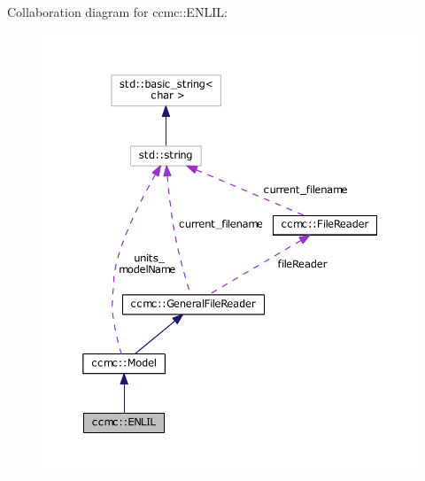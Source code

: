 Collaboration diagram for ccmc\-:\-:E\-N\-L\-I\-L\-:
\nopagebreak
\begin{figure}[H]
\begin{center}
\leavevmode
\includegraphics[width=350pt]{classccmc_1_1_e_n_l_i_l__coll__graph}
\end{center}
\end{figure}
